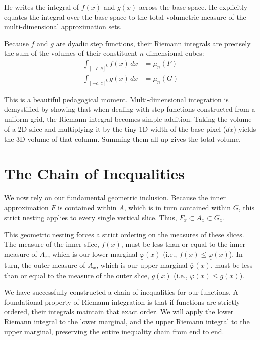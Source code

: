 \begin{ai-note}
He writes the integral of $f(x)$ and $g(x)$ across the base space. He explicitly equates the integral over the base space to the total volumetric measure of the multi-dimensional approximation sets.
\end{ai-note}

\begin{math-stroke}
Because $f$ and $g$ are dyadic step functions, their Riemann integrals are precisely the sum of the volumes of their constituent $n$-dimensional cubes:
\begin{align*}
\int_{[-c,c]^k} f(x) \, dx &= \mu_n(F) \\
\int_{[-c,c]^k} g(x) \, dx &= \mu_n(G)
\end{align*}
\end{math-stroke}

\begin{didactic-insight}
This is a beautiful pedagogical moment. Multi-dimensional integration is demystified by showing that when dealing with step functions constructed from a uniform grid, the Riemann integral becomes simple addition. Taking the volume of a 2D slice and multiplying it by the tiny 1D width of the base pixel ($dx$) yields the 3D volume of that column. Summing them all up gives the total volume.
\end{didactic-insight}

\section{The Chain of Inequalities}

\begin{spoken-clean}[25:30 - 27:30]
We now rely on our fundamental geometric inclusion. Because the inner approximation $F$ is contained within $A$, which is in turn contained within $G$, this strict nesting applies to every single vertical slice. Thus, $F_x \subset A_x \subset G_x$. 

This geometric nesting forces a strict ordering on the measures of these slices. The measure of the inner slice, $f(x)$, must be less than or equal to the inner measure of $A_x$, which is our lower marginal $\underline{\varphi}(x)$ (i.e., $f(x) \le \underline{\varphi}(x)$). In turn, the outer measure of $A_x$, which is our upper marginal $\overline{\varphi}(x)$, must be less than or equal to the measure of the outer slice, $g(x)$ (i.e., $\overline{\varphi}(x) \le g(x)$). 

We have successfully constructed a chain of inequalities for our functions. A foundational property of Riemann integration is that if functions are strictly ordered, their integrals maintain that exact order. We will apply the lower Riemann integral to the lower marginal, and the upper Riemann integral to the upper marginal, preserving the entire inequality chain from end to end.
\end{spoken-clean}

